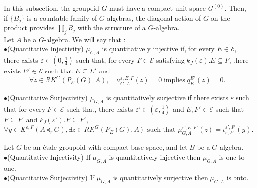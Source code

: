 In this subsection, the groupoid $G$ must have a compact unit space $G^{(0)}$. Then, if $\{B_j\}$ is a countable family of $G$-algebras, the diagonal action of $G$ on the product provides $\prod_j B_j$ with the structure of a $G$-algebra. \\

Let $A$ be a $G$-algebra. We will say that :\\

$\bullet$(Quantitative Injectivity) $\mu_{G,A}$ is quantitatively injective if, for every $E\in \mathcal E$, there exists $\varepsilon\in (0,\frac{1}{4})$ such that, for every $F\in\mathcal E$ satisfying $k_J(\varepsilon). E \subseteq F$, there exists $E'\in\mathcal E$ such that $E\subseteq E'$ and 
\[\forall z\in RK^G(P_E(G),A),\quad\mu_{G,A}^{\varepsilon,E,F}(z) = 0 \text{ implies } q_E^{E'}(z)=0.\]

$\bullet$(Quantitative Surjectivity) $\mu_{G,A}$ is quantitatively surjective if there exists $\varepsilon$ such that for every $F\in \mathcal E$ such that, there exists $\varepsilon' \in (\varepsilon,\frac{1}{4})$ and $E,F'\in\mathcal E$ such that $F \subseteq F'$ and $k_J(\varepsilon'). E\subseteq F'$,  
\[\forall y\in K^{\varepsilon, F}(A\rtimes_r G),\exists z\in RK^G(P_E(G),A) \text{ such that } \mu_{G,A}^{\varepsilon', E, F'}(z)=\iota_{\varepsilon,F}^{\varepsilon',F'}(y).\]

\begin{prop} 
Let $G$ be an étale groupoid with compact base space, and let $B$ be a $G$-algebra.\\

$\bullet$(Quantitative Injectivity) If $\mu_{G,A}$ is quantitatively injective then $\mu_{G,A}$ is one-to-one.\\
$\bullet$(Quantitative Surjectivity) If $\mu_{G,A}$ is quantitatively surjective then $\mu_{G,A}$ is onto.\\
\end{prop}

